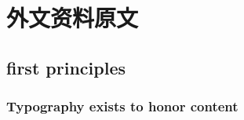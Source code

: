 
\chapter{外文资料原文}
\section{first principles}
\subsection{Typography exists to honor content}
\lipsum